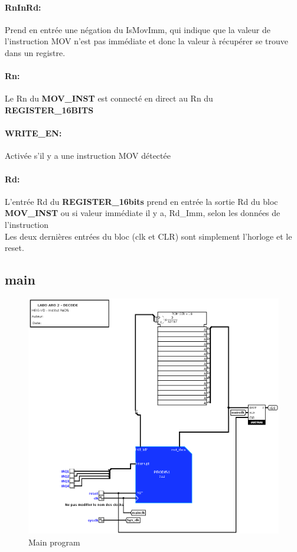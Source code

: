 \documentclass[a4paper]{article} %
\begin{document}
\paragraph{RnInRd:} 
Prend en entrée une négation du IsMovImm, qui indique que la valeur de l'instruction MOV n'est pas immédiate et donc la valeur à récupérer se trouve dans un registre.

\paragraph{Rn:}
Le Rn du \textbf{MOV\_INST} est connecté en direct au Rn du \textbf{REGISTER\_16BITS}

\paragraph{WRITE\_EN:}
Activée s'il y a une instruction MOV détectée

\paragraph{Rd:}
L'entrée Rd du \textbf{REGISTER\_16bits} prend en entrée la sortie Rd du bloc \textbf{MOV\_INST} ou si valeur immédiate il y a, Rd\_Imm, selon les données de l'instruction\\

Les deux dernières entrées du bloc (clk et CLR) sont simplement l'horloge et le reset.




\subsection{main}
\begin{figure}[H]
    \centering
    \includegraphics[width=1\textwidth]{src/main.png}
    \caption{Main program}
    \label{main_img}
\end{figure}
\end{document}
